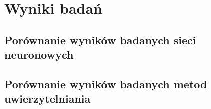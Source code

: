 \chapter{Wyniki badań}
\section{Porównanie wyników badanych sieci neuronowych}
\section{Porównanie wyników badanych metod uwierzytelniania}

